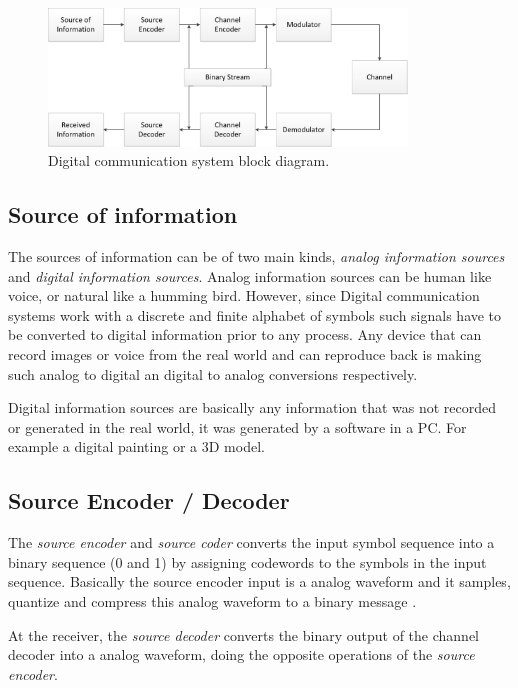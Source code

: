 \begin{figure}[htbp]
    \centering
    \includegraphics[width=0.85\textwidth]{./figures/digicom_bd}
    \caption{ Digital communication system block diagram.
    \label{fig:digcombd}}
\end{figure}

\subsection{Source of information}

The sources of information can be of two main kinds, \emph{analog information
sources} and \emph{digital information sources}. Analog information sources can
be human like voice, or natural like a humming bird. However, since Digital
communication systems work with a discrete and finite alphabet of symbols such
signals have to be converted to digital information prior to any process. Any
device that can record images or voice from the real world and can reproduce
back is making such analog to digital an digital to analog conversions
respectively.

Digital information sources are basically any information that was not
recorded or generated in the real world, it was generated by a software in a
PC. For example a digital painting or a 3D model.

\subsection{Source Encoder / Decoder}

The \emph{source encoder}  and \emph{source coder} converts the input symbol
sequence into a binary sequence (0 and 1) by assigning codewords to the symbols
in the input sequence. Basically the source encoder input is a analog waveform
and it samples, quantize and compress this analog waveform to a binary message
\cite{ocw:digicomm} \cite{akbook}.

At the receiver, the \emph{source decoder} converts the binary output of the
channel decoder into a analog waveform, doing the opposite operations of the
\emph{source encoder}.

